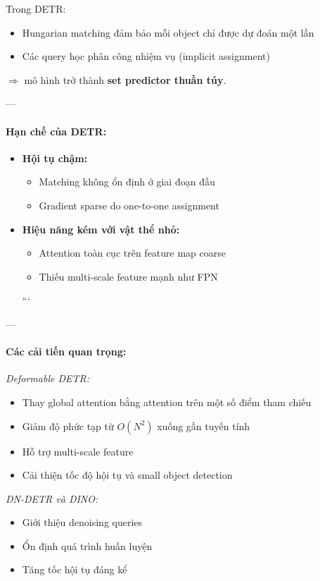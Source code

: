 Trong DETR:
\begin{itemize}
	\item Hungarian matching đảm bảo mỗi object chỉ được dự đoán một lần
	\item Các query học phân công nhiệm vụ (implicit assignment)
\end{itemize}

$\Rightarrow$ mô hình trở thành \textbf{set predictor thuần túy}.

---

\paragraph{Hạn chế của DETR:}

\begin{itemize}
	\item \textbf{Hội tụ chậm:}
	\begin{itemize}
		\item Matching không ổn định ở giai đoạn đầu
		\item Gradient sparse do one-to-one assignment
	\end{itemize}
	\item \textbf{Hiệu năng kém với vật thể nhỏ:}
	\begin{itemize}
		\item Attention toàn cục trên feature map coarse
		\item Thiếu multi-scale feature mạnh như FPN
	\end{itemize}
	```
	
\end{itemize}

---

\paragraph{Các cải tiến quan trọng:}

\textit{Deformable DETR:}
\begin{itemize}
	\item Thay global attention bằng attention trên một số điểm tham chiếu
	\item Giảm độ phức tạp từ $O(N^2)$ xuống gần tuyến tính
	\item Hỗ trợ multi-scale feature
	\item Cải thiện tốc độ hội tụ và small object detection
\end{itemize}

\textit{DN-DETR và DINO:}
\begin{itemize}
	\item Giới thiệu denoising queries
	\item Ổn định quá trình huấn luyện
	\item Tăng tốc hội tụ đáng kể
\end{itemize}

